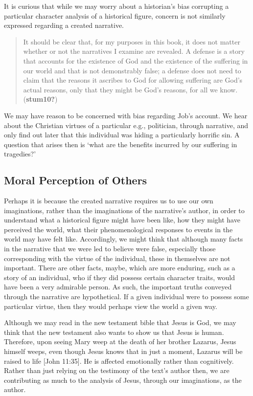 \documentclass[12pt]{book}
\theoremstyle{definition}
\theoremstyle{remark}
\begin{document}
It is curious that while we may worry about a historian's bias corrupting a particular character analysis of a historical figure, concern is not similarly expressed regarding a created narrative.

\begin{quote}
It should be clear that, for my purposes in this book, it does not matter whether or not the narratives I examine are revealed. A defense is a story that accounts for the existence of God and the existence of the suffering in our world and that is not demonstrably false; a defense does not need to claim that the reasons it ascribes to God for allowing suffering are God's actual reasons, only that they might be God's reasons, for all we know. (\textbf{stum10?})
\end{quote}

We may have reason to be concerned with bias regarding Job's account. We hear about the Christian virtues of a particular e.g., politician, through narrative, and only find out later that this individual was hiding a particularly horrific sin. A question that arises then is `what are the benefits incurred by our suffering in tragedies?'

\subsection*{Moral Perception of Others}\label{moral-perception-of-others-1}

Perhaps it is because the created narrative requires us to use our own imaginations, rather than the imaginations of the narrative's author, in order to understand what a historical figure might have been like, how they might have perceived the world, what their phenomenological responses to events in the world may have felt like. Accordingly, we might think that although many facts in the narrative that we were led to believe were false, especially those corresponding with the virtue of the individual, these in themselves are not important. There are other facts, maybe, which are more enduring, such as a story of an individual, who if they did possess certain character traits, would have been a very admirable person. As such, the important truths conveyed through the narrative are hypothetical. If a given individual were to possess some particular virtue, then they would perhaps view the world a given way.

Although we may read in the new testament bible that Jesus is God, we may think that the new testament also wants to show us that Jesus is human. Therefore, upon seeing Mary weep at the death of her brother Lazarus, Jesus himself weeps, even though Jesus knows that in just a moment, Lazarus will be raised to life {[}John 11:35{]}. He is affected emotionally rather than cognitively. Rather than just relying on the testimony of the text's author then, we are contributing as much to the analysis of Jesus, through our imaginations, as the author.
\end{document}
